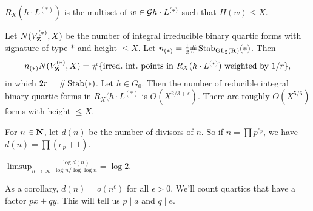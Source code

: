 \begin{definition}
$R_X(h\cdot L^{(\ast)})$ is the multiset of $w\in \mathcal{G} h\cdot L^{(\ast)}$ such 
that $H(w)\leqslant X$. 
\end{definition}

Let $N(V_{\mathbf{Z}}^{(\ast)},X)$ be the number of integral irreducible binary quartic 
forms with signature of type $\ast$ and height $\leqslant X$. Let 
$n_{(\ast)}=\frac 1 2\#\operatorname{Stab}_{\operatorname{GL}_2(\mathbf{R})}(\ast)$. Then 
\[
  n_{(\ast)} N(V_{\mathbf{Z}}^{(\ast)},X) = \#\{\text{irred.~int.~points in }R_X(h\cdot L^{(\ast)})\text{ weighted by $1/r$}\},
\]
in which $2 r=\#\operatorname{Stab}(\ast)$. Let $h\in G_0$. Then the number of 
reducible integral binary quartic forms in $R_X(h\cdot L^{(\ast)}$ is 
$O(X^{2/3+\epsilon})$. There are roughly $O(X^{5/6})$ forms with height 
$\leqslant X$. 

For $n\in \mathbf{N}$, let $d(n)$ be the number of divisors of $n$. So if 
$n=\prod p^{e_p}$, we have $d(n)=\prod (e_p+1)$. 

\begin{lemma}
$\limsup_{n\to \infty} \frac{\log d(n)}{\log n/\log\log n} = \log 2$. 
\end{lemma}

As a corollary, $d(n)=o(n^\epsilon)$ for all $\epsilon>0$. We'll count 
quartics that have a factor $p x+q y$. This will tell us $p\mid a$ and 
$q\mid e$. 




